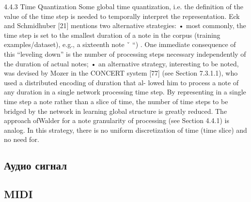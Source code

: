 4.4.3 Time Quantization
Some global time quantization, i.e. the definition of the value of the time step is needed to temporally interpret the representation. Eck and Schmidhuber [21] mentions two alternative strategies:
• most commonly, the time step is set to the smallest duration of a note in the corpus
(training examples/dataset), e.g., a sixteenth note ˇ “) . One immediate consequence of this “leveling down” is the number of processing steps necessary independently of the duration of actual notes;
• an alternative strategy, interesting to be noted, was devised by Mozer in the CONCERT system [77] (see Section 7.3.1.1), who used a distributed encoding of duration that al-
lowed him to process a note of any duration in a single network processing time step. By representing in a single time step a note rather than a slice of time, the number of time steps to be bridged by the network in learning global structure is greatly reduced. The approach ofWalder for a note granularity of processing (see Section 4.4.1) is analog. In this strategy, there is no uniform discretization of time (time slice) and no need for.

\subsection{Аудио сигнал}

\subsection{MIDI}

